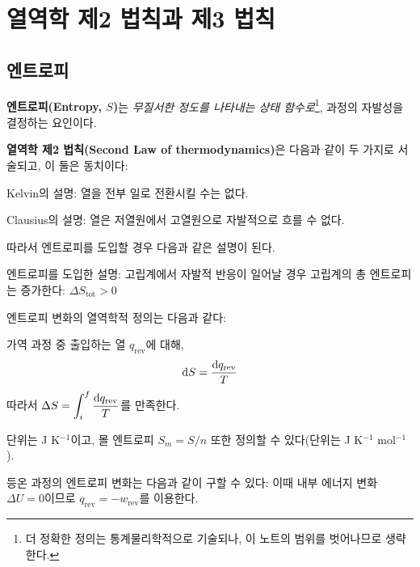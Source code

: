 \chapter{열역학 제2 법칙과 제3 법칙}
    \section{엔트로피}
        \hspace{\parindent}
        \begin{defn}[엔트로피]
        \textbf{엔트로피(Entropy, $S$)}는 \textit{무질서한 정도를 나타내는 상태 함수로}\footnote[8]{더 정확한 정의는 통계물리학적으로 기술되나, %
        이 노트의 범위를 벗어나므로 생략한다.}, 과정의 자발성을 결정하는 요인이다.
        \end{defn}
        \textbf{열역학 제2 법칙(Second Law of thermodynamics)}은 다음과 같이 두 가지로 
        서술되고, 이 둘은 동치이다:
        \begin{rem}
        \begin{enum}
            \item Kelvin의 설명: 열을 전부 일로 전환시킬 수는 없다.
            \item Clausius의 설명: 열은 저열원에서 고열원으로 자발적으로 흐를 수 없다. 
        \end{enum}
        \end{rem}
        따라서 엔트로피를 도입할 경우 다음과 같은 설명이 된다.
        \begin{rem}
            엔트로피를 도입한 설명: 고립계에서 자발적 반응이 일어날 경우 고립계의 총 엔트로피는 증가한다: $\displaystyle\Delta S_{\mathrm{tot}} > 0$ 
        \end{rem}
        \par 엔트로피 변화의 열역학적 정의는 다음과 같다:
        \begin{defn}[엔트로피 변화]
        가역 과정 중 출입하는 열 $q_{\mathrm{rev}}$에 대해,
        \begin{equation*}
            \operatorname{d\!} S = \frac{\operatorname{d\!} q_{\mathrm{rev}}}{T}
        \end{equation*}
        따라서 $\displaystyle\Delta S = \int_{i}^{f}\frac{\operatorname{d\!} q_{\mathrm{rev}}}{T}$를 만족한다.
        \end{defn}
        단위는 J K$^{-1}$이고, 몰 엔트로피 $S_m = S/n$ 또한 정의할 수 
        있다(단위는 J K$^{-1}$ mol$^{-1}$).
        \par 등온 과정의 엔트로피 변화는 다음과 같이 구할 수 있다: 이때 내부 에너지 변화 $\displaystyle\Delta U = 0$이므로 $q_\mathrm{rev} = -w_\mathrm{rev}$를 이용한다.
